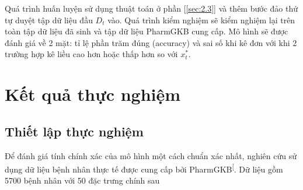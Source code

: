 \documentclass[14pt,oneside]{scrbook}
\begin{document}
Quá trình huấn luyện sử dụng thuật toán ở phần {[}\ref{sec:2.3}{]} và
thêm bước đảo thứ tự duyệt tập dữ liệu đầu \(D_t\) vào. Quá trình kiểm
nghiệm sẽ kiểm nghiệm lại trên toàn tập dữ liệu đã sinh và tập dữ liệu
PharmGKB cung cấp. Mô hình sẽ được đánh giá về 2 mặt: tỉ lệ phần trăm
đúng (accuracy) và sai số khi kê đơn với khi 2 trường hợp kê liều cao
hơn hoặc thấp hơn so với \(x^*_t\).

\chapter{Kết quả thực nghiệm}\label{sec:3}

\section{Thiết lập thực nghiệm}\label{thux1ef1c-nghiux1ec7m}

Để đánh giá tính chính xác của mô hình một cách chuẩn xác nhất, nghiên
cứu sử dụng dữ liệu bệnh nhân thực tế được cung cấp bởi
PharmGKB\textsuperscript{{[}\citeproc{ref-warfarin-data}{6}{]}}. Dữ liệu
gồm 5700 bệnh nhân với 50 đặc trưng chính sau
\end{document}
